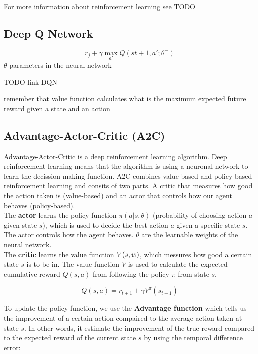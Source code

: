 For more information about reinforcement learning see TODO


\subsection{Deep Q Network}

\begin{equation}
r_j + \gamma \max_{a'} Q(s{t+1}, a'; \theta^-)
\end{equation}
$\theta$ parameters in the neural network

TODO link DQN


remember that value function calculates what is the maximum expected future reward given a state and an action
\subsection{Advantage-Actor-Critic (A2C)}

Advantage-Actor-Critic is a deep reinforcement learning algorithm. Deep reinforcement learning means that the algorithm is using a neuronal network to learn the decission making function. A2C combines value based and policy based reinforcement learning and consits of two parts. A critic that measures how good the action taken is (value-based) and an actor that controls how our agent behaves (policy-based).\\

The \textbf{actor} learns the policy function $\pi(a | s, \theta)$ (probability of choosing action $a$ given state $s$), which is used to decide the best action $a$ given a specific state $s$.
The actor controls how the agent behaves.
$\theta$ are the learnable weights of the neural network. \\

The \textbf{critic} learns the value function $\mathnormal{V(s, w)}$, which messures how good a certain state $s$ is to be in. The value function $V$ is used to calculate the expected cumulative reward $Q(s, a)$ from following the policy $\pi$ from state $s$.

\begin{equation}
	Q(s, a) = r_{t+1} + \gamma V^\pi(s_{t+1})
\end{equation}

To update the policy function, we use the \textbf{Advantage function} which tells us the improvement of a certain action compaired to the average action taken at state $s$. 
In other words, it estimate the improvement of the true reward compared to the expected reward of the current state $s$ by using the temporal difference error:


